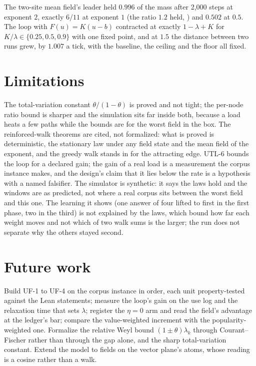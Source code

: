 \documentclass[11pt,a4paper]{article}
\theoremstyle{plain}
\theoremstyle{definition}
\newcommand{\lean}[1]{\path{#1}}
\begin{document}
The two-site mean field's leader held $0.996$ of the mass after 2{,}000 steps at exponent $2$,
exactly $6/11$ at exponent $1$ (the ratio $1.2$ held, \lean{polya\_ratio\_eq}) and $0.502$ at
$0.5$. The loop with $F(u) = K(u - b)$ contracted at exactly $1 - \lambda + K$ for
$K/\lambda \in \{0.25, 0.5, 0.9\}$ with one fixed point, and at $1.5$ the distance between two runs
grew, by $1.007$ a tick, with the baseline, the ceiling and the floor all fixed.

\section{Limitations}

The total-variation constant $\theta/(1-\theta)$ is proved and not tight; the per-node ratio bound
is sharper and the simulation sits far inside both, because a load heats a few paths while the
bounds are for the worst field in the box. The reinforced-walk theorems are cited, not formalized:
what is proved is deterministic, the stationary law under any field state and the mean field of the
exponent, and the greedy walk stands in for the attracting edge. UTL-6 bounds the loop for a
declared gain; the gain of a real load is a measurement the corpus instance makes, and the design's
claim that it lies below the rate is a hypothesis with a named falsifier. The simulator is
synthetic: it says the laws hold and the windows are as predicted, not where a real corpus sits
between the worst field and this one. The learning it shows (one answer of four lifted to first in
the first phase, two in the third) is not explained by the laws, which bound how far each weight
moves and not which of two walk sums is the larger; the run does not separate why the others stayed
second.

\section{Future work}

Build UF-1 to UF-4 on the corpus instance in order, each unit property-tested against the Lean
statements; measure the loop's gain on the use log and the relaxation time that sets $\lambda$;
register the $\eta = 0$ arm and read the field's advantage at the ledger's bar; compare the
value-weighted increment with the popularity-weighted one. Formalize the relative Weyl bound
$(1 \pm \theta)\lambda_k$ through Courant--Fischer rather than through the gap alone, and the
sharp total-variation constant. Extend the model to fields on the vector plane's atoms, whose
reading is a cosine rather than a walk.
\end{document}
